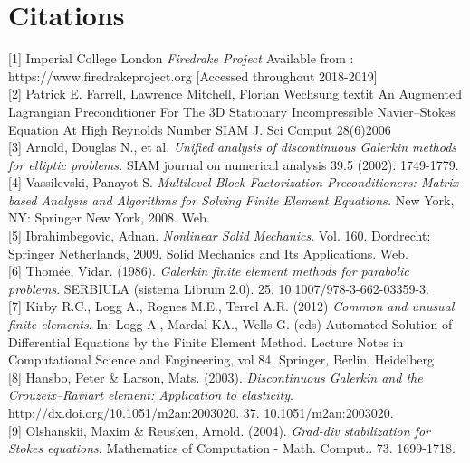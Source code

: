 \documentclass[11pt,twoside,a4paper]{article}
\begin{document}
\section{Citations}

[1] Imperial College London \textit{Firedrake Project} Available from : https://www.firedrakeproject.org [Accessed throughout 2018-2019]\\

[2] Patrick E. Farrell, Lawrence Mitchell, Florian Wechsung
textit{ An Augmented Lagrangian Preconditioner For The 3D Stationary Incompressible Navier–Stokes Equation At High Reynolds Number}
SIAM J. Sci Comput 28(6)2006\\

[3] Arnold, Douglas N., et al. \textit{Unified analysis of discontinuous Galerkin methods for elliptic problems.} SIAM journal on numerical analysis 39.5 (2002): 1749-1779.\\

[4] Vassilevski, Panayot S. \textit{Multilevel Block Factorization Preconditioners: Matrix-based Analysis and Algorithms for Solving Finite Element Equations.} New York, NY: Springer New York, 2008. Web.\\

[5] Ibrahimbegovic, Adnan. \textit{Nonlinear Solid Mechanics}. Vol. 160. Dordrecht: Springer Netherlands, 2009. Solid Mechanics and Its Applications. Web.\\

[6] Thomée, Vidar. (1986). \textit{Galerkin finite element methods for parabolic problems}. SERBIULA (sistema Librum 2.0). 25. 10.1007/978-3-662-03359-3. \\

[7]  Kirby R.C., Logg A., Rognes M.E., Terrel A.R. (2012) \textit{Common and unusual finite elements}. In: Logg A., Mardal KA., Wells G. (eds) Automated Solution of Differential Equations by the Finite Element Method. Lecture Notes in Computational Science and Engineering, vol 84. Springer, Berlin, Heidelberg\\

[8] Hansbo, Peter \& Larson, Mats. (2003). \textit{Discontinuous Galerkin and the Crouzeix–Raviart element: Application to elasticity}. http://dx.doi.org/10.1051/m2an:2003020. 37. 10.1051/m2an:2003020. \\

[9] Olshanskii, Maxim \& Reusken, Arnold. (2004). \textit{Grad-div stabilization for Stokes equations}. Mathematics of Computation - Math. Comput.. 73. 1699-1718. \\
\end{document}
